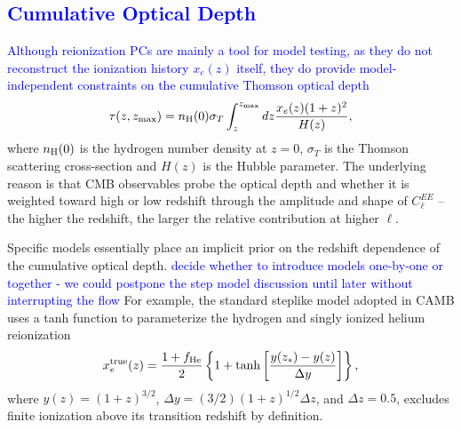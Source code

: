 \documentclass[prd,twocolumn,amsmath,amssymb,floatfix,superscriptaddress,nofootinbib]{revtex4-1}
\newcommand{\wh}[1]{\textcolor{blue}{#1}}
\begin{document}
\subsection{\wh{Cumulative Optical Depth}}

\wh{Although reionization PCs are mainly a tool for model testing, as they do not reconstruct the ionization history $x_e(z)$ itself, they do provide model-independent constraints on  the cumulative Thomson optical depth}
\begin{equation}
\tau(z,z_{\rm max}) = n_{\rm H}(0) \sigma_T \int_z^{z_{\rm max}} dz \frac{x_e(z) (1+z)^{2} }{H(z)},
\label{eq:cumtau}
\end{equation}
where $n_{\rm H}(0)$ is the hydrogen number density at $z=0$, $\sigma_T$ is the Thomson scattering cross-section and $H(z)$ is the Hubble parameter.  The underlying reason is that CMB observables probe the optical depth and whether it is weighted toward high or low redshift through the amplitude and shape of 
$C_\ell^{EE}$ -- the higher the redshift, the
larger the relative contribution at higher $\ell$.

Specific models essentially place an implicit prior on the redshift dependence of the cumulative optical depth.  
\wh{decide whether to introduce models one-by-one or together - we could postpone the step model discussion until later without interrupting the flow}
For example, the standard steplike model adopted in CAMB uses a tanh function to parameterize the hydrogen and singly ionized helium reionization
 \begin{equation}
x_e^{\rm true}(z) = \frac{1+f_{\rm He}}{2}\left\{  1+ \tanh\left[ \frac{y(z_*)-y(z)}{\Delta y} \right] \right\},
 \label{eqn:tanh}
 \end{equation}
 where $y(z)=(1+z)^{3/2}$, $\Delta y=(3/2)(1+z)^{1/2}\Delta z$, and $\Delta z = 0.5$,
 excludes finite ionization above its transition redshift by definition.
 
\end{document}
